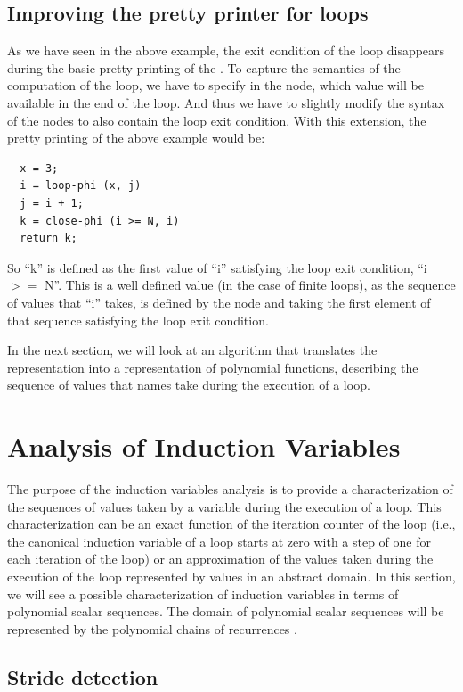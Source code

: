 \subsection{Improving the \SSA{} pretty printer for loops}

As we have seen in the above example, the exit condition of the loop
disappears during the basic pretty printing of the \SSA{}.  To capture
the semantics of the computation of the loop, we have to specify in
the \closephi{} node, which value will be available in the end of the
loop.  And thus we have to slightly modify the syntax of the
\closephi{} nodes to also contain the loop exit condition.  With this
extension, the \SSA{} pretty printing of the above example would be:
\begin{verbatim}
  x = 3;
  i = loop-phi (x, j)
  j = i + 1;
  k = close-phi (i >= N, i)
  return k;
\end{verbatim}
So ``k'' is defined as the first value of ``i'' satisfying the loop
exit condition, ``i $>=$ N''.  This is a well defined value (in the
case of finite loops), as the sequence of values that ``i'' takes, is
defined by the \loopphi{} node and taking the first element of that
sequence satisfying the loop exit condition.

In the next section, we will look at an algorithm that translates the
\SSA{} representation into a representation of polynomial functions,
describing the sequence of values that \SSA{} names take during the
execution of a loop.

\section{Analysis of Induction Variables}

The purpose of the induction variables analysis is to provide a
characterization of the sequences of values taken by a variable during
the execution of a loop.  This characterization can be an exact
function of the iteration counter of the loop (i.e., the canonical
induction variable of a loop starts at zero with a step of one for
each iteration of the loop) or an approximation of the values taken
during the execution of the loop represented by values in an abstract
domain.  In this section, we will see a possible characterization of
induction variables in terms of polynomial scalar sequences.  The
domain of polynomial scalar sequences will be represented by the
polynomial chains of recurrences \cite{BWZ94,KMZ98,Zim01}.

\subsection{Stride detection}

